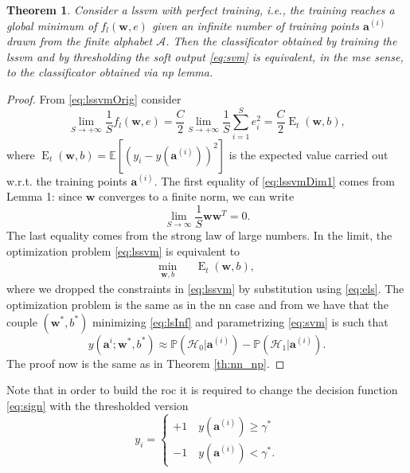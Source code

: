 \documentclass[draftcls,onecolumn,12pt]{IEEEtran}
\newcommand{\ie}{i.e., }
\newcommand{\wrt}{w.r.t. }
\newcommand{\Exp}[1]{\mathbb{E}\left[#1\right]}
\DeclareMathOperator{\E}{E}
\newtheorem{theorem}{Theorem}
\begin{document}
\begin{theorem}
\label{th:lsnp}
Consider a \ac{lssvm} with perfect training, \ie the training reaches a global minimum of $f_l(\mathbf{w},e)$ given an infinite number of training points $\bm{a}^{(i)}$ drawn from the finite alphabet $\mathcal A$. Then the classificator obtained by training the \ac{lssvm} and by thresholding the soft output \eqref{eq:svm} is equivalent, in the \ac{mse} sense, to the classificator obtained via \ac{np} lemma.
\end{theorem}
\begin{proof}
From \eqref{eq:lssvmOrig} consider
\begin{equation}
\label{eq:lssvmDim1}
	\lim_{S \to +\infty} \frac{1}{S} f_l(\mathbf{w},e) =\frac{C}{2} \lim_{S \to +\infty}\frac{1}{S}  \sum_{i=1}^S e^2_i	=\frac{C}{2}\E_t(\mathbf{w},b),
\end{equation}
where $\E_t(\mathbf{w},b) = \Exp{\left(y_i - y(\mathbf{a}^{(i)})\right)^2} $ is the expected value carried out \wrt the training points $\mathbf{a}^{(i)}$. 
The first equality of \eqref{eq:lssvmDim1} comes from Lemma 1: since $\mathbf{w}$ converges to a finite norm, we can write
\begin{equation}
	\lim_{S\to \infty} \frac{1}{S} \mathbf{w} \mathbf{w}^T 	= 0.
\end{equation} 
The last equality comes from the strong law of large numbers. In the limit, the optimization problem \eqref{eq:lssvm} is equivalent to
\begin{equation}
\label{eq:lsInf}
	\begin{aligned}
	& \underset{\mathbf{w},b}{\text{min}} & &  \E_t(\mathbf{w},b), & 
	\end{aligned}	
\end{equation}
where we dropped the constraints in \eqref{eq:lssvm} by substitution using \eqref{eq:els}. The optimization problem is the same as in the \ac{nn} case and from \cite{Ruck-90} we have that the couple $(\mathbf{w}^*,b^*)$ minimizing \eqref{eq:lsInf} and parametrizing \eqref{eq:svm} is such that
\begin{equation}
	 y(\mathbf{a}^i;\mathbf{w}^*,b^*)  \approx \mathbb{P}(\mathcal{H}_0|\mathbf{a}^{(i)}) - \mathbb{P}(\mathcal{H}_1|\mathbf{a}^{(i)}).
\end{equation}
The proof now is the same as in Theorem \ref{th:nn_np}.
\end{proof}
Note that in order to build the \ac{roc} it is required to change the decision function \eqref{eq:sign} with the thresholded version
\begin{equation}
y_i = 
\begin{cases}
 +1 \quad y(\mathbf{a}^{(i)})  \geq \gamma^* \\
 -1 \quad y(\mathbf{a}^{(i)})  < \gamma^*.
\end{cases}		
\end{equation}
\end{document}
